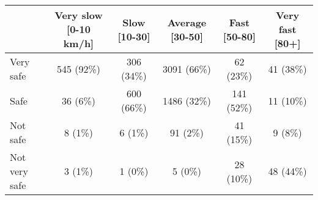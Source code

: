 \begin{tabular}{l c|c|c|c|c} \hline  & Very slow [0-10 km/h] & Slow [10-30] & Average [30-50] & Fast [50-80] & Very fast [80+] \\ 
\hline Very safe & 545 (92\%) & 306 (34\%) & 3091 (66\%) & 62 (23\%) & 41 (38\%) \\ 
  Safe & 36 (6\%) & 600 (66\%) & 1486 (32\%) & 141 (52\%) & 11 (10\%) \\ 
  Not safe & 8 (1\%) & 6 (1\%) & 91 (2\%) & 41 (15\%) & 9 (8\%) \\ 
  Not very safe & 3 (1\%) & 1 (0\%) & 5 (0\%) & 28 (10\%) & 48 (44\%) \\ 
 \hline \end{tabular}